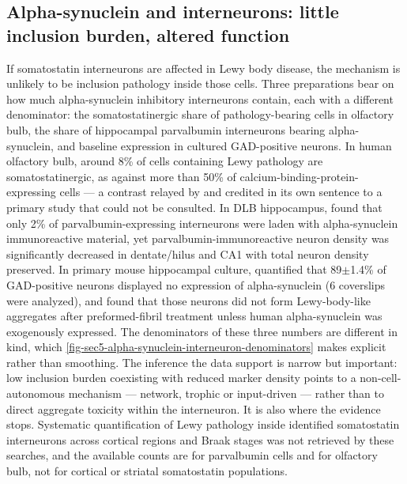 \documentclass[11pt]{article}
\begin{document}
\subsection{Alpha-synuclein and interneurons: little inclusion burden, altered function}
\label{sec-05-alpha-synuclein-burden}

If somatostatin interneurons are affected in Lewy body disease, the mechanism is unlikely to be inclusion pathology inside those cells. Three preparations bear on how much alpha-synuclein inhibitory interneurons contain, each with a different denominator: the somatostatinergic share of pathology-bearing cells in olfactory bulb, the share of hippocampal parvalbumin interneurons bearing alpha-synuclein, and baseline expression in cultured GAD-positive neurons. In human olfactory bulb, around 8\% of cells containing Lewy pathology are somatostatinergic, as against more than 50\% of calcium-binding-protein-expressing cells --- a contrast relayed by \citet{SaizSanchez2020} and credited in its own sentence to a primary study that could not be consulted. In DLB hippocampus, \citet{Bernstein2011} found that only 2\% of parvalbumin-expressing interneurons were laden with alpha-synuclein immunoreactive material, yet parvalbumin-immunoreactive neuron density was significantly decreased in dentate/hilus and CA1 with total neuron density preserved. In primary mouse hippocampal culture, \citet{Taguchi2014} quantified that 89$\pm$1.4\% of GAD-positive neurons displayed no expression of alpha-synuclein (6 coverslips were analyzed), and found that those neurons did not form Lewy-body-like aggregates after preformed-fibril treatment unless human alpha-synuclein was exogenously expressed. The denominators of these three numbers are different in kind, which \ref{fig-sec5-alpha-synuclein-interneuron-denominators} makes explicit rather than smoothing. The inference the data support is narrow but important: low inclusion burden coexisting with reduced marker density points to a non-cell-autonomous mechanism --- network, trophic or input-driven --- rather than to direct aggregate toxicity within the interneuron. It is also where the evidence stops. Systematic quantification of Lewy pathology inside identified somatostatin interneurons across cortical regions and Braak stages was not retrieved by these searches, and the available counts are for parvalbumin cells and for olfactory bulb, not for cortical or striatal somatostatin populations.
\end{document}
